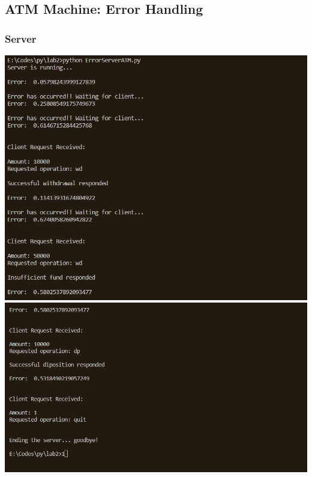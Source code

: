 \documentclass[11pt]{article}
\begin{document}
    \subsection{ATM Machine: Error Handling}
        \subsubsection{Server}
        \includegraphics[width=\textwidth]{ErrorServer1.png}
        \includegraphics[width=\textwidth]{ErrorServer2.png}
\end{document}
